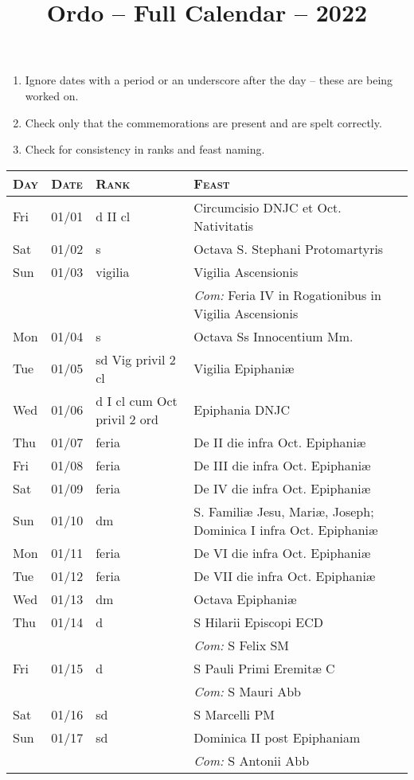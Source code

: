 \documentclass[10pt]{article}
\title{Ordo -- Full Calendar -- 2022}
\begin{document}
\begin{enumerate}
    \item Ignore dates with a period or an underscore after the day -- these are being worked on.
    \item Check only that the commemorations are present and are spelt correctly.
    \item Check for consistency in ranks and feast naming.
\end{enumerate}
\begin{longtable}{ l l l l }
\hline
\textsc{Day} & \textsc{Date} & \textsc{Rank} & \textsc{Feast} \\
\hline
\endhead
Fri & 01/01 & d II cl & Circumcisio DNJC et Oct. Nativitatis\\
Sat & 01/02 & s & Octava S. Stephani Protomartyris\\
Sun & 01/03 & vigilia & Vigilia Ascensionis\\
 & & & \textit{Com:} Feria IV in Rogationibus in Vigilia Ascensionis \\
Mon & 01/04 & s & Octava Ss Innocentium Mm.\\
Tue & 01/05 & sd Vig privil 2 cl & Vigilia Epiphaniæ\\
Wed & 01/06 & d I cl cum Oct privil 2 ord & Epiphania DNJC\\
Thu & 01/07 & feria & De II die infra Oct. Epiphaniæ\\
Fri & 01/08 & feria & De III die infra Oct. Epiphaniæ\\
Sat & 01/09 & feria & De IV die infra Oct. Epiphaniæ\\
Sun & 01/10 & dm & S. Familiæ Jesu, Mariæ, Joseph; Dominica I infra Oct. Epiphaniæ\\
Mon & 01/11 & feria & De VI die infra Oct. Epiphaniæ\\
Tue & 01/12 & feria & De VII die infra Oct. Epiphaniæ\\
Wed & 01/13 & dm & Octava Epiphaniæ\\
Thu & 01/14 & d & S Hilarii Episcopi ECD\\
 & & & \textit{Com:} S Felix SM\\
Fri & 01/15 & d & S Pauli Primi Eremitæ C\\
 & & & \textit{Com:} S Mauri Abb\\
Sat & 01/16 & sd & S Marcelli PM\\
Sun & 01/17 & sd & Dominica II post Epiphaniam\\
 & & & \textit{Com:} S Antonii Abb\\

\end{longtable}
\end{document}
